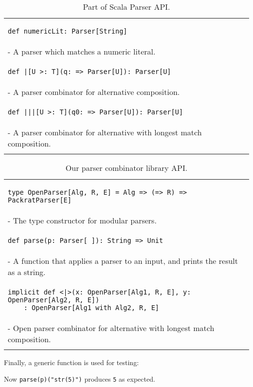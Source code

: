 \begin{table}[t]
\begin{tabular}{l}
\hline
\begin{lstlisting}
def numericLit: Parser[String]
\end{lstlisting} \\
\hspace{.2in}- A parser which matches a numeric literal. \\
\hline
\begin{lstlisting}
def |[U >: T](q: => Parser[U]): Parser[U]
\end{lstlisting} \\
\hspace{.2in}- A parser combinator for alternative composition. \\
\hline
\begin{lstlisting}
def |||[U >: T](q0: => Parser[U]): Parser[U]
\end{lstlisting} \\
\hspace{.2in}- A parser combinator for alternative with longest match composition. \\
\hline \\
\end{tabular}
\caption{Part of Scala Parser API.}\label{tab:packrat}
\end{table}

\begin{table}[t]
\begin{tabular}{l}
\hline
\begin{lstlisting}
type OpenParser[Alg, R, E] = Alg => (=> R) => PackratParser[E]
\end{lstlisting} \\
\hspace{.2in}- The type constructor for modular parsers. \\
\hline
\begin{lstlisting}
def parse(p: Parser[_]): String => Unit
\end{lstlisting} \\
\hspace{.2in}- A function that applies a parser to an input, and prints the result as a string. \\
\hline
\begin{lstlisting}
implicit def <|>(x: OpenParser[Alg1, R, E], y: OpenParser[Alg2, R, E])
    : OpenParser[Alg1 with Alg2, R, E]
\end{lstlisting} \\
\hspace{.2in}- Open parser combinator for alternative with longest match composition. \\
\hline \\
\end{tabular}
\caption{Our parser combinator library \name API.}\label{tab:parser}
\end{table}

Finally, a generic 
function is used for testing:

Now \lstinline{parse(p)("str(5)")} produces \lstinline{5} as expected.